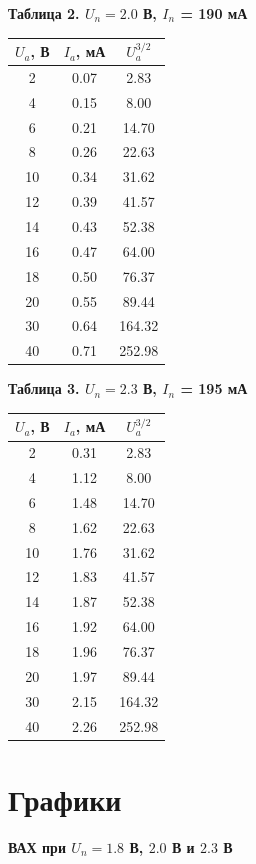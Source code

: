\documentclass[a4paper,14pt]{extarticle}
\begin{document}
\textbf{Таблица 2. $U_n = 2.0$ В, $I_n$ = 190 мА}
\begin{center}
\begin{tabular}{|c|c|c|}
\hline
$U_a$, В & $I_a$, мА & $U_a^{3/2}$ \\
\hline
2 & 0.07 & 2.83 \\
4 & 0.15 & 8.00 \\
6 & 0.21 & 14.70 \\
8 & 0.26 & 22.63 \\
10 & 0.34 & 31.62 \\
12 & 0.39 & 41.57 \\
14 & 0.43 & 52.38 \\
16 & 0.47 & 64.00 \\
18 & 0.50 & 76.37 \\
20 & 0.55 & 89.44 \\
30 & 0.64 & 164.32 \\
40 & 0.71 & 252.98 \\
\hline
\end{tabular}
\end{center}

\textbf{Таблица 3. $U_n = 2.3$ В, $I_n$ = 195 мА}
\begin{center}
\begin{tabular}{|c|c|c|}
\hline
$U_a$, В & $I_a$, мА & $U_a^{3/2}$ \\
\hline
2 & 0.31 & 2.83 \\
4 & 1.12 & 8.00 \\
6 & 1.48 & 14.70 \\
8 & 1.62 & 22.63 \\
10 & 1.76 & 31.62 \\
12 & 1.83 & 41.57 \\
14 & 1.87 & 52.38 \\
16 & 1.92 & 64.00 \\
18 & 1.96 & 76.37 \\
20 & 1.97 & 89.44 \\
30 & 2.15 & 164.32 \\
40 & 2.26 & 252.98 \\
\hline
\end{tabular}
\end{center}


\section*{Графики}

\textbf{ВАХ при $U_n = 1.8$ В, $2.0$ В и $2.3$ В}
\end{document}
